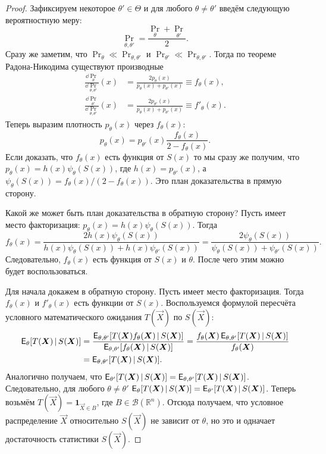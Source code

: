 \begin{proof}
	Зафиксируем некоторое $\theta' \in \Theta$ и для любого $\theta \neq \theta'$ введём следующую вероятностную меру:
	\[
		\Pr_{\theta, \theta'} = \frac{\Pr_{\theta} + \Pr_{\theta'}}{2}.
	\]
	Сразу же заметим, что $\Pr_{\theta} \ll \Pr_{\theta, \theta'}$ и $\Pr_{\theta'} \ll \Pr_{\theta, \theta'}$. Тогда по теореме Радона-Никодима существуют производные
	\begin{align*}
		\frac{\dd \Pr_{\theta}}{\dd \Pr_{\theta, \theta'}}(x)
		&= \frac{2p_{\theta}(x)}{p_{\theta}(x) + p_{\theta'}(x)} 
		\equiv f_{\theta}(x), \\
		\frac{\dd \Pr_{\theta'}}{\dd \Pr_{\theta, \theta'}}(x)
		&= \frac{2p_{\theta'}(x)}{p_{\theta}(x) + p_{\theta'}(x)} 
		\equiv f'_{\theta}(x).
	\end{align*}
	Теперь выразим плотность $p_{\theta}(x)$ через $f_{\theta}(x)$:
	\[
		p_{\theta}(x) 
		= p_{\theta'}(x)\frac{f_{\theta}(x)}{2 - f_{\theta}(x)}.
	\]
	Если доказать, что $f_{\theta}(x)$ есть функция от $S(x)$ то мы сразу же получим, что $p_{\theta}(x) = h(x)\psi_{\theta}(S(x))$, где $h(x) = p_{\theta'}(x)$, а $\psi_{\theta}(S(x)) = f_{\theta}(x)/(2 - f_{\theta}(x))$. Это план доказательства в прямую сторону.

	Какой же может быть план доказательства в обратную сторону? Пусть имеет место факторизация: $p_{\theta}(x) = h(x)\psi_{\theta}(S(x))$. Тогда
	\[
		f_{\theta}(x) 
		= \frac{2h(x)\psi_{\theta}(S(x))}{h(x)\psi_{\theta}(S(x)) + h(x)\psi_{\theta'}(S(x))}
		= \frac{2\psi_{\theta}(S(x))}{\psi_{\theta}(S(x)) + \psi_{\theta'}(S(x))}.
	\]
	Следовательно, $f_{\theta}(x)$ есть функция от $S(x)$ и $\theta$. После чего этим можно будет воспользоваться.

	Для начала докажем в обратную сторону. Пусть имеет место факторизация. Тогда $f_{\theta}(x)$ и $f'_{\theta}(x)$ есть функции от $S(x)$. Воспользуемся формулой пересчёта условного математического ожидания $T(\vec{X})$ по $S(\vec{X})$:
	\begin{align*}
		\operatorname{\mathsf{E}}_{\theta}[T(\bm{X})\,|\,S(\bm{X})]
		&= \frac{\operatorname{\mathsf{E}}_{\theta, \theta'}[T(\bm{X})f_{\theta}(\bm{X})\,|\,S(\bm{X})]}{\operatorname{\mathsf{E}}_{\theta, \theta'}[f_{\theta}(\bm{X})\,|\,S(\bm{X})]}
		= \frac{f_{\theta}(\bm{X})\operatorname{\mathsf{E}}_{\theta, \theta'}[T(\bm{X})\,|\,S(\bm{X})]}{f_{\theta}(\bm{X})} \\
		&= \operatorname{\mathsf{E}}_{\theta, \theta'}[T(\bm{X})\,|\,S(\bm{X})].
	\end{align*}
	Аналогично получаем, что $\operatorname{\mathsf{E}}_{\theta'}[T(\bm{X})\,|\,S(\bm{X})] = \operatorname{\mathsf{E}}_{\theta, \theta'}[T(\bm{X})\,|\,S(\bm{X})]$. Следовательно, для любого $\theta \neq \theta'$ $\operatorname{\mathsf{E}}_{\theta}[T(\bm{X})\,|\,S(\bm{X})] = \operatorname{\mathsf{E}}_{\theta'}[T(\bm{X})\,|\,S(\bm{X})]$. Теперь возьмём $T(\vec{X}) = \mathbf{1}_{\vec{X} \in B}$, где $B \in \mathcal{B}(\mathbb{R}^{n})$. Отсюда получаем, что условное распределение $\vec{X}$ относительно $S(\vec{X})$ не зависит от $\theta$, но это и одначает достаточность статистики $S(\vec{X})$.


\end{proof}

